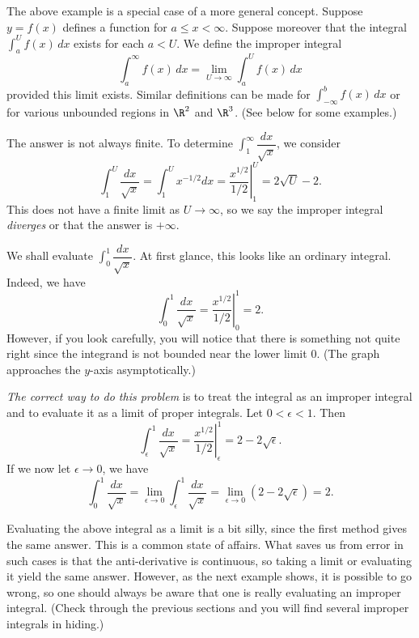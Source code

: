    
The above example is a special case of a more general concept.
Suppose  $y = f(x)$ defines a function for $a \le x < \infty$.
Suppose moreover that the integral $\int_a^U f(x)\, dx$ exists
for each $a < U$.  We define the improper integral
$$
   \int_a^\infty f(x)\,dx = \lim_{U\to \infty} \int_a^U f(x)\,dx
$$
provided this limit exists.  Similar definitions can be made
for $\int_{-\infty}^b f(x)\, dx$ or for various unbounded regions
in $\R^2$ and $\R^3$.   (See below for some examples.) 
\medskip
\centerline{}
\medskip
The answer is not always finite.
\nextex
{} 
To determine
$\int_1^\infty \dfrac {dx}{\sqrt x}$, we consider 
$$
     \int_1^U \frac{dx}{\sqrt x} =
     \int_1^U x^{-1/2} dx =
\left. \frac{x^{1/2}}{1/2}\right|_1^U = 2\sqrt U - 2.
$$
This does not have a finite limit as $U \to \infty$, so we
say the improper integral {\it diverges\/} or that the answer
is $+\infty$.
%
\endexample

\nextex
{}  We shall evaluate $\int_0^1\dfrac{dx}{\sqrt x}$.
At first glance, this looks like an ordinary integral.  Indeed,
we have
$$
     \int_0^1 \frac{dx}{\sqrt x} =
\left. \frac{x^{1/2}}{1/2}\right|_0^1 = 2.
$$
However, if you look carefully, you will notice that there is
something not quite right since the integrand is not bounded
near the lower limit $0$.  (The graph approaches the $y$-axis
asymptotically.)
\medskip
\centerline{}
\medskip
 {\it The correct way to do this problem\/}
is to treat the integral as an improper integral and to evaluate
it as a limit of proper integrals.   Let $0 < \epsilon  < 1$.  Then
$$
     \int_\epsilon^1 \frac{dx}{\sqrt x} =
\left. \frac{x^{1/2}}{1/2}\right|_\epsilon^1 = 2 - 2\sqrt\epsilon.
$$
If we now let $\epsilon \to 0$, we have
$$
 \int_0^1 \frac{dx}{\sqrt x} =
\lim_{\epsilon\to 0} \int_\epsilon^1 \frac{dx}{\sqrt x} =
\lim_{\epsilon\to 0} (2 - 2\sqrt\epsilon) = 2.
$$
\endexample

Evaluating the above integral
as a limit is a bit silly, since the first method gives the same answer.
This is a common state of affairs.  What saves us from error in
such cases is that the anti-derivative is continuous, so taking
a limit or evaluating it yield the same answer.
However, as the next example shows, it is possible to go
wrong, so one should always be aware that one is really evaluating
an improper integral.   (Check through the previous sections and
you will find several improper integrals in hiding.)

